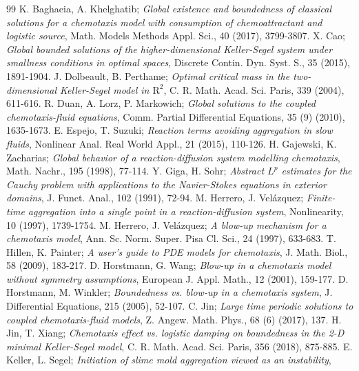 \documentclass[10pt,a4paper]{amsart}
\numberwithin{equation}{section}
\begin{document}
\begin{thebibliography}{99}
 K. Baghaeia, A. Khelghatib; 
\emph{Global existence and boundedness of classical solutions for a chemotaxis model with 
consumption of chemoattractant and logistic source},
 Math. Models Methods Appl. Sci., 40 (2017), 3799-3807.
 X. Cao; 
\emph{Global bounded solutions of the higher-dimensional Keller-Segel system under 
smallness conditions in optimal spaces}, 
Discrete Contin. Dyn. Syst. S., 35 (2015), 1891-1904.
 J. Dolbeault, B. Perthame;
\emph{Optimal critical mass in the two-dimensional Keller-Segel model in $\mathrm{R}^2$}, 
C. R. Math. Acad. Sci. Paris, 339 (2004), 611-616.
 R. Duan, A. Lorz, P. Markowich;
\emph{Global solutions to the coupled chemotaxis-fluid equations}, 
Comm. Partial Differential Equations, 35 (9) (2010), 1635-1673.
 E. Espejo, T. Suzuki;
\emph{Reaction terms avoiding aggregation in slow fluids}, 
Nonlinear Anal. Real World Appl., 21 (2015), 110-126.
 H. Gajewski, K. Zacharias;
\emph{Global behavior of a reaction-diffusion system modelling chemotaxis}, 
Math. Nachr., 195 (1998), 77-114.
 Y. Giga, H. Sohr;
\emph{Abstract $L^p$ estimates for the Cauchy problem with applications to the 
Navier-Stokes equations in exterior domains}, J. Funct. Anal., 102 (1991), 72-94.
 M. Herrero, J. Vel\'{a}zquez;
\emph{Finite-time aggregation into a single point in a reaction-diffusion system}, 
Nonlinearity, 10 (1997), 1739-1754.
 M. Herrero, J. Vel\'{a}zquez;
\emph{A blow-up mechanism for a chemotaxis model}, 
Ann. Sc. Norm. Super. Pisa Cl. Sci., 24 (1997), 633-683.
 T. Hillen, K. Painter;
\emph{A user's guide to PDE models for chemotaxis}, 
J. Math. Biol., 58 (2009), 183-217.
 D. Horstmann, G. Wang;
\emph{Blow-up in a chemotaxis model without symmetry assumptions}, 
European J. Appl. Math., 12 (2001), 159-177.
 D. Horstmann, M. Winkler;
\emph{Boundedness vs. blow-up in a chemotaxis system}, 
J. Differential Equations, 215 (2005), 52-107.
 C. Jin;
\emph{Large time periodic solutions to coupled chemotaxis-fluid models}, 
Z. Angew. Math. Phys., 68 (6) (2017), 137.
 H. Jin, T. Xiang;
\emph{Chemotaxis effect vs. logistic damping on boundedness in the 2-D minimal 
Keller-Segel model}, C. R. Math. Acad. Sci. Paris, 356 (2018), 875-885.
 E. Keller, L. Segel;
\emph{Initiation of slime mold aggregation viewed as an instability}, 

\end{thebibliography}
\end{document}
